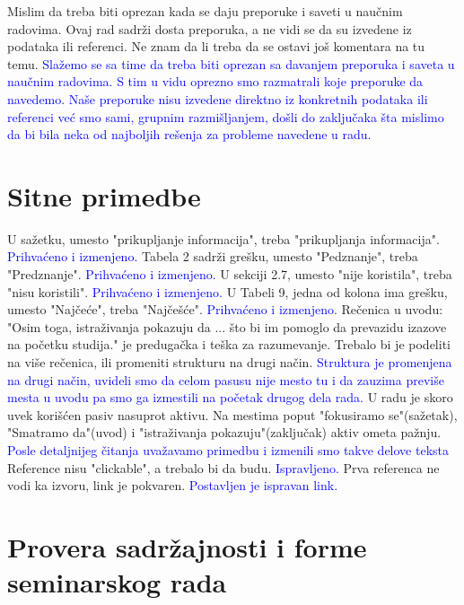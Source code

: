 \documentclass[a4paper]{report}
\newcommand{\odgovor}[1]{\textcolor{blue}{#1}}
\begin{document}
Mislim da treba biti oprezan kada se daju preporuke i saveti u naučnim radovima. Ovaj rad sadrži dosta preporuka, a ne vidi se da su izvedene iz podataka ili referenci. Ne znam da li treba da se ostavi još komentara na tu temu. \odgovor{Slažemo se sa time da treba biti oprezan sa davanjem preporuka i saveta u naučnim radovima. S tim u vidu oprezno smo razmatrali koje preporuke da navedemo. Naše preporuke nisu izvedene direktno iz konkretnih podataka ili referenci već smo sami, grupnim razmišljanjem, došli do zaključaka šta mislimo da bi bila neka od najboljih rešenja za probleme navedene u radu.}
\hfill \break

\section{Sitne primedbe}

U sažetku, umesto "prikupljanje informacija", treba "prikupljanja informacija". \odgovor{Prihvaćeno i izmenjeno.} \hfill \break
Tabela 2 sadrži grešku, umesto "Pedznanje", treba "Predznanje". \odgovor{Prihvaćeno i izmenjeno.}\hfill \break
U sekciji 2.7, umesto "nije koristila", treba "nisu koristili". \odgovor{Prihvaćeno i izmenjeno.}\hfill \break
U Tabeli 9, jedna od kolona ima grešku, umesto "Najčeće", treba "Najčešće". \odgovor{Prihvaćeno i izmenjeno.}\hfill \break
\break
Rečenica u uvodu: "Osim toga, istraživanja pokazuju da ... što bi im pomoglo da prevazidu izazove na početku studija." je predugačka i teška za razumevanje. Trebalo bi je podeliti na više rečenica, ili promeniti strukturu na drugi način. \odgovor{Struktura je promenjena na drugi način, uvideli smo da celom pasusu nije mesto tu i da zauzima previše mesta u uvodu pa smo ga izmestili na početak drugog dela rada.}\hfill \break
\break
U radu je skoro uvek korišćen pasiv nasuprot aktivu. Na mestima poput "fokusiramo se"(sažetak), "\vspace{0cm}Smatramo da"(uvod) i "istraživanja pokazuju"(zaključak) aktiv ometa pažnju. \odgovor{Posle detaljnijeg čitanja uvažavamo primedbu i izmenili smo takve delove teksta} \hfill \break
\break
Reference nisu "\vspace{0cm}clickable", a trebalo bi da budu. \odgovor{Ispravljeno.} \hfill \break
Prva referenca ne vodi ka izvoru, link je pokvaren. \odgovor{Postavljen je ispravan link.} \hfill \break


\section{Provera sadržajnosti i forme seminarskog rada}
\end{document}
